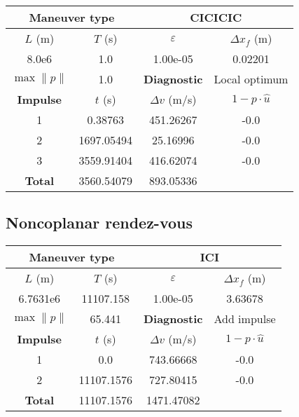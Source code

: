 \begin{table}[htpb]
    \centering
    \begin{tabular}{cccc} \toprule
    \multicolumn{2}{c}{\textbf{Maneuver type}} & \multicolumn{2}{c}{CICICIC} \\ \midrule
    \(L\) (m) & \(T\) (s) & \(\varepsilon\) & \(\Delta x_{f}\) (m)    \\ \midrule
    8.0e6          & 1.0          & 1.00e-05                & 0.02201                        \\ \midrule
    \(\max \lVert p \rVert\) & 1.0     & \textbf{Diagnostic}   & Local optimum        \\ \midrule
    \textbf{Impulse} & \(t\) (s) & \(\Delta v\) (m/s) & \(1 - p \cdot \hat{u}\) \\ \midrule
    1                 & 0.38763          & 451.26267             & -0.0                    \\
    2                 & 1697.05494          & 25.16996             & -0.0                    \\
    3                 & 3559.91404          & 416.62074             & -0.0                    \\\midrule
    \textbf{Total}   & 3560.54079          & 893.05336             &                     \\ \bottomrule   
    \end{tabular}
\end{table}



\subsection{Noncoplanar rendez-vous}


\begin{table}[htpb]
    \centering
    \begin{tabular}{cccc} \toprule
    \multicolumn{2}{c}{\textbf{Maneuver type}} & \multicolumn{2}{c}{ICI} \\ \midrule
    \(L\) (m) & \(T\) (s) & \(\varepsilon\) & \(\Delta x_{f}\) (m)    \\ \midrule
    6.7631e6          & 11107.158          & 1.00e-05                & 3.63678                        \\ \midrule
    \(\max \lVert p \rVert\) & 65.441     & \textbf{Diagnostic}   & Add impulse        \\ \midrule
    \textbf{Impulse} & \(t\) (s) & \(\Delta v\) (m/s) & \(1 - p \cdot \hat{u}\) \\ \midrule
    1                 & 0.0          & 743.66668             & -0.0                    \\
    2                 & 11107.1576          & 727.80415             & -0.0                    \\\midrule
    \textbf{Total}   & 11107.1576          & 1471.47082             &                     \\ \bottomrule   
    \end{tabular}
\end{table}


